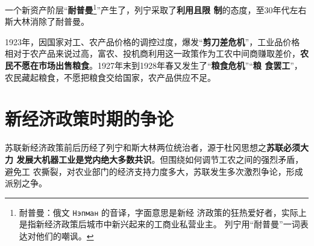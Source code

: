 \begin{enumerate}
  一个新资产阶层“\textbf{耐普曼}\footnote{耐普曼：俄文 \texttt{Нэпман} 的音译，字面意思是新经
    济政策的狂热爱好者，实际上是指新经济政策后城市中新兴起来的工商业私营业主。
    列宁用“耐普曼”一词表达对他们的嘲讽。}”产生了，列宁采取了\textbf{利用且限
    制}的态度，至30年代左右斯大林消除了耐普曼。

  1923年，因国家对工、农产品价格的调控过度，爆发“\textbf{剪刀差危机}”，工业品价格
  相对于农产品来说过高，富农、投机商利用这一政策作为工农中间商赚取差价，\textbf{农
    民不愿在市场出售粮食}。1927年末到1928年春又发生了“\textbf{粮食危机}”“\textbf{粮
    食罢工}”，农民藏起粮食，不愿把粮食交给国家，农产品供应不足。
\end{enumerate}


\section{新经济政策时期的争论}

苏联新经济政策前后历经了列宁和斯大林两位统治者，源于杜冈思想之\textbf{苏联必须大力
  发展大机器工业是党内绝大多数共识}。但围绕如何调节工农之间的强烈矛盾，避免工
农撕裂，对农业部门的经济支持力度多大，苏联发生多次激烈争论，形成派别之争。


